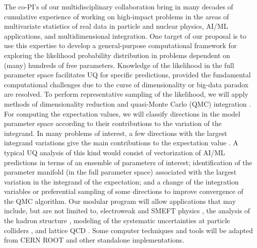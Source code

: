 \documentclass[11pt,titlepage,
preprint,
aps,prd,
nofootinbib,
superscriptaddress,
showpacs,
amsmath,
amssymb
]{article}
\begin{document}
The co-PI's of our multidisciplinary collaboration bring in many
decades of cumulative experience of working on high-impact problems
in the areas of multivariate statistics of real data in particle
and nuclear physics, AI/ML applications, and
multidimensional integration. One target of our proposal is to use this
expertise to develop a general-purpose computational framework for
exploring the likelihood probability distribution in problems
dependent on (many) hundreds of free parameters. Knowledge of the 
likelihood in the full parameter space facilitates
UQ for specific predictions, provided the fundamental computational
challenges due to the curse of dimensionality \cite{Bellman:1961,Bishop:2006,Sloan:1997a,Sloan:1998b} or big-data paradox \cite{MengXL:2018,Hickernell:2018a} are resolved. To perform representative sampling of the likelihood, we will apply methods of
dimensionality reduction and quasi-Monte Carlo (QMC) integration \cite{Lemieux:2009,Hickernell:2020a,LEcuyer:2020a,Hickernell:2018a}. For computing
the expectation values, we will  classify directions in the model parameter space according
to their contributions to the variation of the integrand. In many problems
of interest, a few directions with the largest integrand variations 
give the main contributions to the expectation value \cite{Caflisch:1997ValuationOM,Sloan:1998b,LiuOwen:2006}.  A typical UQ
analysis of this kind would consist of vectorization of AI/ML predictions in terms
of an ensemble of parameters of interest; identification of the
parameter manifold (in the full parameter space) associated with the
largest variation in the integrand of the expectation; and a change of the
integration variables or preferential sampling of some
directions to improve convergence of the QMC algorithm. 
Our modular program will allow applications that may include, but are not limited to,
electroweak and SMEFT physics \cite{Castro:2022zpq,deBlas:2022ofj},
the analysis of the hadron structure \cite{Amoroso:2022eow,Courtoy:2022ocu}, 
modeling of the systematic
uncertainties at particle colliders \cite{Cranmer:2021urp}, and lattice QCD \cite{Boyda:2022nmh}. Some computer techniques and tools will be adapted from CERN ROOT \cite{CERNROOTWebsite} and other standalone implementations.
\end{document}
